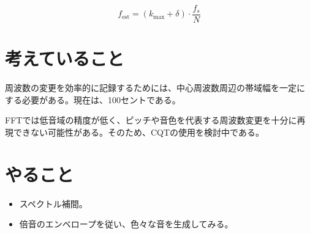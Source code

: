 \documentclass[a4paper, 11pt]{article}
\begin{document}
\[
f_{\text{est}} = \left(k_{\text{max}} + \delta\right) \cdot \frac{f_s}{N}
\]

\section*{考えていること}

周波数の変更を効率的に記録するためには、中心周波数周辺の帯域幅を一定にする必要がある。現在は、100セントである。

FFTでは低音域の精度が低く、ピッチや音色を代表する周波数変更を十分に再現できない可能性がある。そのため、CQTの使用を検討中である。






\section*{やること}
\begin{itemize}
    \item スペクトル補間。
    \item 倍音のエンベロープを従い、色々な音を生成してみる。
\end{itemize}



\end{document}

